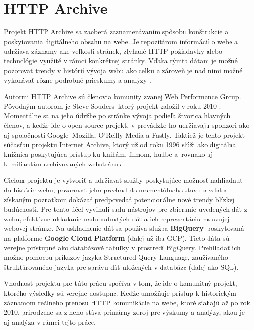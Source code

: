 
\section{HTTP Archive}
\label{httparchive}

Projekt HTTP Archive sa zaoberá zaznamenávaním spôsobu konštrukcie a poskytovania digitálneho obsahu na webe. 
Je repozitárom informácií o webe a udržiava záznamy ako veľkosti
stránok, zlyhané HTTP požiadavky alebo technológie využité v rámci konkrétnej stránky. 
Vďaka týmto dátam je možné pozorovať trendy v histórií vývoja webu ako celku a zároveň je nad nimi možné vykonávať rôzne podrobné prieskumy a analýzy \cite{httparchive-about}. 

Autormi HTTP Archive sú členovia komunity zvanej Web Performance Group. Pôvodným autorom je Steve Souders, ktorý projekt založil v roku 2010 \cite{httparchive-faq}.
Momentálne sa na jeho údržbe po stránke vývoja podieľa štvorica hlavných členov, a keďže ide o open source projekt, v prevádzke ho udržiavajú sponzori ako aj spoločnosti Google, Mozilla, O'Reilly Media a Fastly.
Taktiež je tento projekt súčasťou projektu Internet Archive, ktorý už od roku 1996 slúži ako digitálna knižnica poskytujúca prístup ku knihám, filmom, hudbe \mbox{a rovnako} aj \mbox{k miliardám} archivovaných webstránok \cite{httparchive-about}.

Cieľom projektu je vytvoriť a udržiavať služby poskytujúce možnosť nahliadnuť do histórie webu, pozorovať jeho prechod do momentálneho stavu a vďaka získaným poznatkom dokázať
predpovedať potencionálne nové trendy blízkej budúcnosti. 
Pre tento účel vyvinuli sadu nástrojov pre zbieranie uvedených dát z webu, efektívne ukladanie nadobudnutých dát a ich reprezentáciu na svojej webovej stránke.
Na uskladnenie dát sa používa služba \mbox{\textbf{BigQuery} poskytovaná} na platforme \textbf{Google Cloud Platform} (ďalej už iba GCP).
Tieto dáta sú verejne prístupné ako databázové tabuľky v prostredí BigQuery.
Prehliadať ich možno pomocou príkazov jazyka Structured Query Language, zaužívaného štruktúrovaného jazyka pre správu dát uložených v databáze (ďalej ako SQL).

Vhodnosť projektu pre túto prácu spočíva v tom, že ide o komunitný projekt, ktorého výsledky sú verejne dostupné. 
Keďže umožňuje prístup k historickým záznamom reálneho prenosu HTTP komunikácie na webe, ktoré siahajú až po rok 2010, prirodzene sa z neho stáva primárny zdroj pre výskumy a analýzy, akou je aj analýza v rámci tejto práce.


